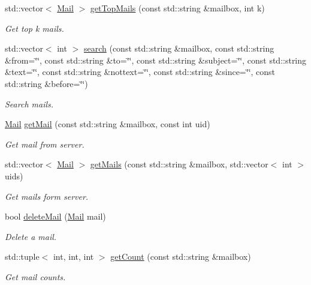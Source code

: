 \begin{DoxyCompactItemize}
std\+::vector$<$ \hyperlink{structMail}{Mail} $>$ \hyperlink{classIMAPConnection_a0ddf65870bb9a995a3bd48a78d80265a}{get\+Top\+Mails} (const std\+::string \&mailbox, int k)
\begin{DoxyCompactList}\small\item\em Get top k mails. \end{DoxyCompactList}\item 
std\+::vector$<$ int $>$ \hyperlink{classIMAPConnection_aef0dd4280dd0f09eaedc69d5dbd54af5}{search} (const std\+::string \&mailbox, const std\+::string \&from=\char`\"{}\char`\"{}, const std\+::string \&to=\char`\"{}\char`\"{}, const std\+::string \&subject=\char`\"{}\char`\"{}, const std\+::string \&text=\char`\"{}\char`\"{}, const std\+::string \&nottext=\char`\"{}\char`\"{}, const std\+::string \&since=\char`\"{}\char`\"{}, const std\+::string \&before=\char`\"{}\char`\"{})
\begin{DoxyCompactList}\small\item\em Search mails. \end{DoxyCompactList}\item 
\hyperlink{structMail}{Mail} \hyperlink{classIMAPConnection_a0c9e1f027a1fb2b095f6dcdf8e4d8c47}{get\+Mail} (const std\+::string \&mailbox, const int uid)
\begin{DoxyCompactList}\small\item\em Get mail from server. \end{DoxyCompactList}\item 
std\+::vector$<$ \hyperlink{structMail}{Mail} $>$ \hyperlink{classIMAPConnection_a91f2832ee1eb91fc441e37d473185a31}{get\+Mails} (const std\+::string \&mailbox, std\+::vector$<$ int $>$ uids)
\begin{DoxyCompactList}\small\item\em Get mails form server. \end{DoxyCompactList}\item 
bool \hyperlink{classIMAPConnection_aba8f1dc3912b1655dfe5dd2fd76a1d7c}{delete\+Mail} (\hyperlink{structMail}{Mail} mail)
\begin{DoxyCompactList}\small\item\em Delete a mail. \end{DoxyCompactList}\item 
std\+::tuple$<$ int, int, int $>$ \hyperlink{classIMAPConnection_a4c93cce25ad9fe1e0ab3950576cdab30}{get\+Count} (const std\+::string \&mailbox)
\begin{DoxyCompactList}\small\item\em Get mail counts. \end{DoxyCompactList}\item 

\end{DoxyCompactItemize}
